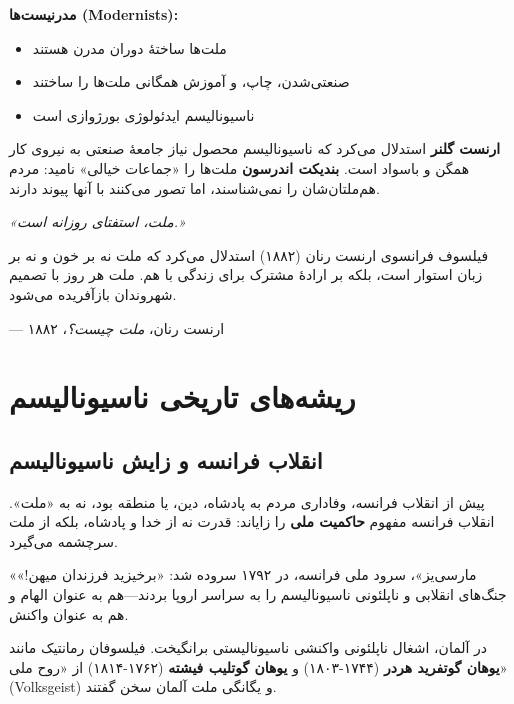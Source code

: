 \textbf{مدرنیست‌ها (Modernists):}
\begin{itemize}
    \item ملت‌ها ساختهٔ دوران مدرن هستند
    \item صنعتی‌شدن، چاپ، و آموزش همگانی ملت‌ها را ساختند
    \item ناسیونالیسم ایدئولوژی بورژوازی است
\end{itemize}

\textbf{ارنست گلنر} استدلال می‌کرد که ناسیونالیسم محصول نیاز جامعهٔ صنعتی به نیروی کار همگن و باسواد است. \textbf{بندیکت اندرسون} ملت‌ها را «جماعات خیالی» نامید: مردم هم‌ملتان‌شان را نمی‌شناسند، اما تصور می‌کنند با آنها پیوند دارند.


\begin{tcolorbox}[
    enhanced,
    colback=centergreen!10,
    colframe=centergreen,
    boxrule=1.5pt,
    arc=5pt,
    fonttitle=\bfseries,
    title={\rl{🟢 نقل‌قول: ارنست رنان}}
]
\textit{«ملت، استفتای روزانه است.»}

فیلسوف فرانسوی ارنست رنان (۱۸۸۲) استدلال می‌کرد که ملت نه بر خون و نه بر زبان استوار است، بلکه بر ارادهٔ مشترک برای زندگی با هم. ملت هر روز با تصمیم شهروندان بازآفریده می‌شود.

\hfill --- ارنست رنان، \textit{ملت چیست؟}، ۱۸۸۲
\end{tcolorbox}

\section{ریشه‌های تاریخی ناسیونالیسم}

\subsection{انقلاب فرانسه و زایش ناسیونالیسم}


پیش از انقلاب فرانسه، وفاداری مردم به پادشاه، دین، یا منطقه بود، نه به «ملت». انقلاب فرانسه مفهوم \textbf{حاکمیت ملی} را زایاند: قدرت نه از خدا و پادشاه، بلکه از ملت سرچشمه می‌گیرد.

«مارسی‌یز»، سرود ملی فرانسه، در ۱۷۹۲ سروده شد: «برخیزید فرزندان میهن!» جنگ‌های انقلابی و ناپلئونی ناسیونالیسم را به سراسر اروپا بردند—هم به عنوان الهام و هم به عنوان واکنش.

در آلمان، اشغال ناپلئونی واکنشی ناسیونالیستی برانگیخت. فیلسوفان رمانتیک مانند \textbf{یوهان گوتفرید هردر} (۱۷۴۴-۱۸۰۳) و \textbf{یوهان گوتلیب فیشته} (۱۷۶۲-۱۸۱۴) از «روح ملی» (Volksgeist) و یگانگی ملت آلمان سخن گفتند.

